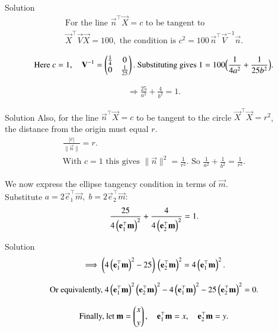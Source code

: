 \documentclass{beamer}
\begin{document}
\begin{frame}{Solution}
\begin{align*}
\text{For the line } \vec{n}^\top\vec{X}=c \text{ to be tangent to } \\
\vec{X}^\top\vec{V}\vec{X}=100,\text{ the condition is } 
c^2 = 100\,\vec{n}^\top\vec{V}^{-1}\vec{n}.
\end{align*}

\begin{align}
\text{Here } c=1,\quad
\mathbf{V}^{-1}=\begin{pmatrix}\tfrac{1}{4} & 0 \\ 0 & \tfrac{1}{25}\end{pmatrix}.
\text{ Substituting gives }
1 = 100\Big(\frac{1}{4a^2}+\frac{1}{25b^2}\Big).
\end{align}

\begin{align}
\Rightarrow \frac{25}{a^2}+\frac{4}{b^2}=1.
\end{align}
\end{frame}

\begin{frame}{Solution}
Also, for the line $\vec{n}^\top\vec{X}=c$ to be tangent to the circle $\vec{X}^\top\vec{X}=r^2$,\\ 
the distance from the origin must equal $r$.
\begin{align}
    \frac{|c|}{\|\vec{n}\|}=r.\\
    \text{With } c=1 \text{ this gives } \|\vec{n}\|^2 = \frac{1}{r^2}.
    \text{ So }
    \frac{1}{a^2}+\frac{1}{b^2}=\frac{1}{r^2}.
\end{align}

We now express the ellipse tangency condition in terms of $\vec{m}$.\\
Substitute $a=2\vec{e}_1^\top\vec{m},\; b=2\vec{e}_2^\top\vec{m}:$
\begin{align}
\frac{25}{4\left(\mathbf{e}_1^\top\mathbf{m}\right)^2}+\frac{4}{4\left(\mathbf{e}_2^\top\mathbf{m}\right)^2}=1.
\end{align}
\end{frame}

\begin{frame}{Solution}
\begin{align}
\implies \left(4\left(\mathbf{e}_1^\top\mathbf{m}\right)^2-25\right)\,\left(\mathbf{e}_2^\top\mathbf{m}\right)^2
=4\left(\mathbf{e}_1^\top\mathbf{m}\right)^2.
\end{align}

\begin{align}
\text{Or equivalently, }
4\left(\mathbf{e}_1^\top\mathbf{m}\right)^2\left(\mathbf{e}_2^\top\mathbf{m}\right)^2
-4\left(\mathbf{e}_1^\top\mathbf{m}\right)^2
-25\left(\mathbf{e}_2^\top\mathbf{m}\right)^2
=0.
\end{align}

\begin{align}
\text{Finally, let } 
\mathbf{m}=\begin{pmatrix}x\\[4pt] y\end{pmatrix},
\quad \mathbf{e}_1^\top\mathbf{m}=x,\quad \mathbf{e}_2^\top\mathbf{m}=y.
\end{align}
\end{frame}
\end{document}
